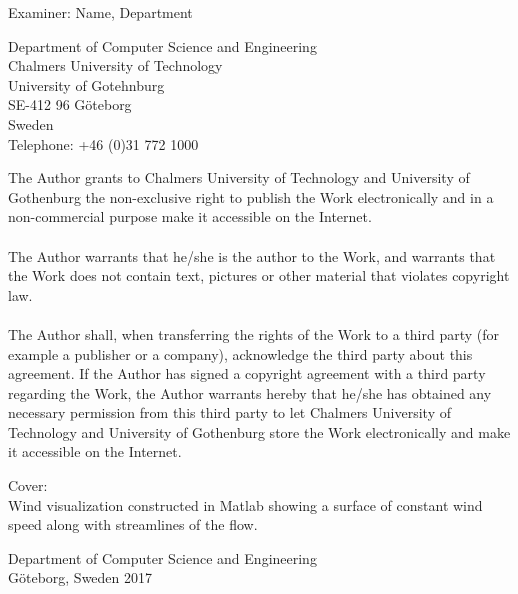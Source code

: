 Examiner: Name, Department \setlength{\parskip}{1cm}

Department of Computer Science and Engineering\\
Chalmers University of Technology\\
University of Gotehnburg\\
SE-412 96 Göteborg\\
Sweden\\
Telephone: +46 (0)31 772 1000 \setlength{\parskip}{0.5cm}

\vfill
The Author grants to Chalmers University of Technology and University of Gothenburg the non-exclusive right to publish the Work electronically and in a non-commercial purpose make it accessible on the Internet.\\\\
The Author warrants that he/she is the author to the Work, and warrants that the Work does not contain text, pictures or other material that violates copyright law.\\\\
The Author shall, when transferring the rights of the Work to a third party (for example a publisher or a company), acknowledge the third party about this agreement. If the Author has signed a copyright agreement with a third party regarding the Work, the Author warrants hereby that he/she has obtained any necessary permission from this third party to let Chalmers University of Technology and University of Gothenburg  store the Work electronically and make it accessible on the Internet.


\vfill
Cover:\\
Wind visualization constructed in Matlab showing a surface of constant wind speed along with streamlines of the flow. \setlength{\parskip}{0.5cm}

Department of Computer Science and Engineering\\
Göteborg, Sweden 2017

